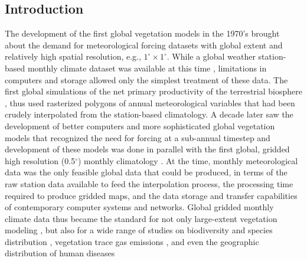 \documentclass[
11pt, %
english, %
singlespacing, %
headsepline, %
]{MastersDoctoralThesis} %
\begin{document}
\begin{NoHyper}
\begin{refsection}
\section{Introduction} \label{sec:gwgen-intro}

The development of the first global vegetation models in the 1970’s \citep[e.g.,][]{Lieth1975} brought about the demand for meteorological forcing datasets with global extent and relatively high spatial resolution, e.g., $1^{\circ}\times1^{\circ}$. While a global weather station-based monthly climate dataset was available at this time \citep{WalterLieth1967}, limitations in computers and storage allowed only the simplest treatment of these data. The first global simulations of the net primary productivity of the terrestrial biosphere \citep{Lieth1975}, thus used rasterized polygons of annual meteorological variables that had been crudely interpolated from the station-based climatology. A decade later saw the development of better computers and more sophisticated global vegetation models \citep{PrenticeCramerHarrisonEtAl1992, Prentice1989} that recognized the need for forcing at a sub-annual timestep and development of these models was done in parallel with the first global, gridded high resolution (0.5$^{\circ}$) monthly climatology \citep{LeemansCramer1991}. At the time, monthly meteorological data was the only feasible global data that could be produced, in terms of the raw station data available to feed the interpolation process, the processing time required to produce gridded maps, and the data storage and transfer capabilities of contemporary computer systems and networks. Global gridded monthly climate data thus became the standard for not only large-extent vegetation modeling \citep{HaxeltinePrentice1996a, HaxeltinePrenticeCreswell1996,KaplanBigelowPrenticeEtAl2003, KucharikFoleyDelireEtAl2000, WoodwardSmithEmanuel1995}, but also for a wide range of studies on biodiversity and species distribution \citep[e.g.,][]{ElithGrahamAndersonEtAl2006}, vegetation trace gas emissions \citep[e.g.,][]{GuentherHewittEricksonEtAl1995}, and even the geographic distribution of human diseases \citep[e.g.,][]{BhattGethingBradyEtAl2013}


\end{refsection}
\end{NoHyper}
\end{document}
